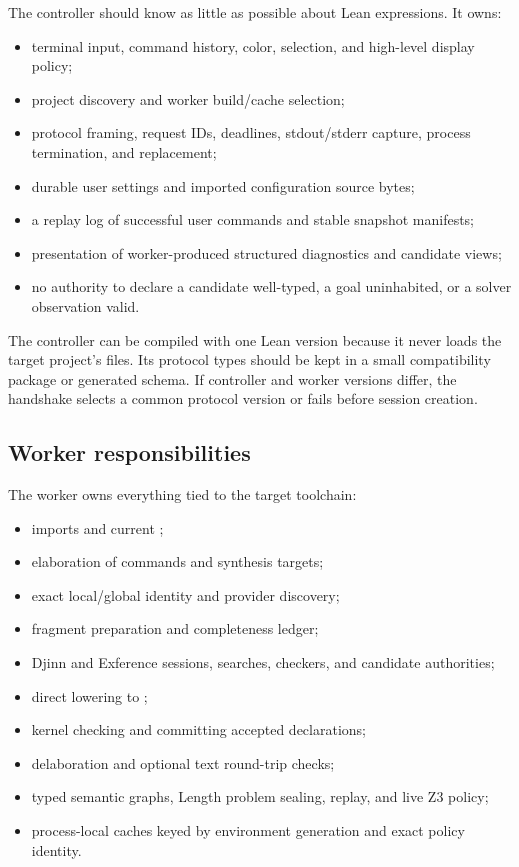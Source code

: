 \documentclass[10pt,letterpaper,oneside]{report}
\newcommand{\code}[1]{\texttt{\detokenize{#1}}}
\begin{document}
The controller should know as little as possible about Lean expressions. It owns:

\begin{itemize}
  \item terminal input, command history, color, selection, and high-level display policy;
  \item project discovery and worker build/cache selection;
  \item protocol framing, request IDs, deadlines, stdout/stderr capture, process termination, and replacement;
  \item durable user settings and imported configuration source bytes;
  \item a replay log of successful user commands and stable snapshot manifests;
  \item presentation of worker-produced structured diagnostics and candidate views;
  \item no authority to declare a candidate well-typed, a goal uninhabited, or a solver observation valid.
\end{itemize}

The controller can be compiled with one Lean version because it never loads the target project's \code{.olean} files. Its protocol types should be kept in a small compatibility package or generated schema. If controller and worker versions differ, the handshake selects a common protocol version or fails before session creation.

\subsection{Worker responsibilities}

The worker owns everything tied to the target toolchain:

\begin{itemize}
  \item imports and current \code{Environment};
  \item elaboration of commands and synthesis targets;
  \item exact local/global identity and provider discovery;
  \item fragment preparation and completeness ledger;
  \item Djinn and Exference sessions, searches, checkers, and candidate authorities;
  \item direct lowering to \code{Expr};
  \item kernel checking and committing accepted \code{itN} declarations;
  \item delaboration and optional text round-trip checks;
  \item typed semantic graphs, Length problem sealing, replay, and live Z3 policy;
  \item process-local caches keyed by environment generation and exact policy identity.
\end{itemize}
\end{document}
